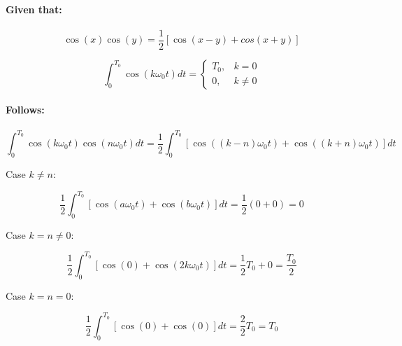 \paragraph{Given that:}

\begin{equation}
	\cos(x) \cos(y) = \frac{1}{2} \left[ \cos(x-y) + cos(x+y) \right]
\end{equation}

\begin{equation}
	\int_0^{T_0} \cos(k \omega_0 t) dt =
	\begin{cases}
		T_0,& k=0\\
		0,& k \neq 0
	\end{cases}
\end{equation}

\paragraph{Follows:}

\[
	\int_0^{T_0} \cos(k \omega_0 t) \cos(n \omega_0 t) dt 
	= \frac{1}{2} \int_0^{T_0} \left[ \cos\left((k-n)\omega_0 t\right) + \cos\left((k+n)\omega_0 t\right)\right] dt
\]


Case $k \neq n$:

\[
	\frac{1}{2} \int_0^{T_0} \left[ \cos\left(a \omega_0 t\right) + \cos\left(b \omega_0 t\right)\right] dt
	= \frac{1}{2} (0 + 0)
	= 0
\]

Case $k = n \neq 0$:

\[
	\frac{1}{2} \int_0^{T_0} \left[ \cos\left(0\right) + \cos\left(2k\omega_0 t\right)\right] dt
	= \frac{1}{2} T_0 + 0
	= \frac{T_0}{2}
\]

Case $k = n = 0$:

\[
	\frac{1}{2} \int_0^{T_0} \left[ \cos\left(0\right) + \cos\left(0\right)\right] dt
	= \frac{2}{2} T_0
	= T_0
\]

